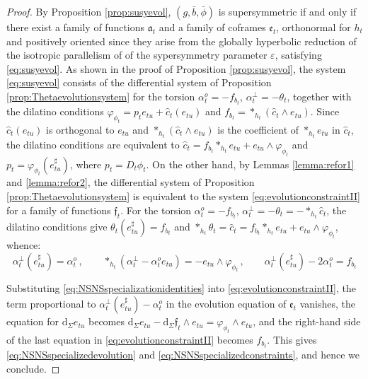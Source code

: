 \documentclass[10pt,reqno,a4paper]{amsart}
\theoremstyle{plain}
\theoremstyle{definition}
\theoremstyle{remark}
\theoremstyle{remark}
\def\dd{\mathrm{d}}
\def\fra{\mathfrak{a}}
\def\fre{\mathfrak{e}}
\renewcommand{\(}{ (}
\renewcommand{\)}{ )}
\newcommand{\frf}{\mathfrak{f}}
\begin{document}
\begin{proof}
By Proposition \ref{prop:susyevol}, $(g,\bar b,\bar\phi)$ is supersymmetric if and only if there exist a family of functions $\fra_t$ and a family of coframes $\fre_t$, orthonormal for $h_t$ and positively oriented since they arise from the globally hyperbolic reduction of the isotropic parallelism of of the sypersymmetry parameter $\varepsilon$, satisfying \eqref{eq:susyevol}. As shown in the proof of Proposition \ref{prop:susyevol}, the system \eqref{eq:susyevol} consists of the differential system of Proposition \ref{prop:Thetaevolutionsystem} for the torsion $\alpha^o_t = - f_{b_t}$, $\alpha^{\perp}_t = -\theta_t$, together with the dilatino conditions $\varphi_{\phi_t}=p_t e_{tu}+\widehat{c}_t(e_{tu})$ and $f_{b_t}=\ast_{h_t}(\widehat{c}_t\wedge e_{tu})$. Since $\widehat{c}_t(e_{tu})$ is orthogonal to $e_{tu}$ and $\ast_{h_t}(\widehat{c}_t\wedge e_{tu})$ is the coefficient of $\ast_{h_t}e_{tu}$ in $\widehat{c}_t$, the dilatino conditions are equivalent to $\widehat{c}_t = f_{b_t}\ast_{h_t} e_{tu} + e_{tu}\wedge \varphi_{\phi_t}$ and $p_t = \varphi_{\phi_t}(e^{\sharp}_{tu})$, where $p_t = D_t \phi_t$. On the other hand, by Lemmas \ref{lemma:refor1} and \ref{lemma:refor2}, the differential system of Proposition \ref{prop:Thetaevolutionsystem} is equivalent to the system \eqref{eq:evolutionconstraintII} for a family of functions $\frf_t$. For the torsion $\alpha^o_t = - f_{b_t}$, $\alpha^{\perp}_t = -\theta_t = -\ast_{h_t}\widehat{c}_t$, the dilatino conditions give $\theta_t(e^{\sharp}_{tu}) = f_{b_t}$ and $\ast_{h_t}\theta_t = \widehat{c}_t = f_{b_t}\ast_{h_t} e_{tu} + e_{tu}\wedge \varphi_{\phi_t}$, whence:
\begin{equation}
\label{eq:NSNSspecializationidentities}
 \alpha_t^\perp(e^{\sharp}_{tu}) = \alpha_t^o\, , \qquad \ast_{h_t}(\alpha_t^\perp-\alpha_t^oe_{tu}) = - e_{tu}\wedge\varphi_{\phi_t}\, ,
 \qquad
 \alpha_t^\perp(e^{\sharp}_{tu})-2\alpha_t^o=f_{b_t}
\end{equation}

\noindent
Substituting \eqref{eq:NSNSspecializationidentities} into \eqref{eq:evolutionconstraintII}, the term proportional to $\alpha^{\perp}_t(e^{\sharp}_{tu}) - \alpha^o_t$ in the evolution equation of $\fre_t$ vanishes, the equation for $\dd_{\Sigma} e_{tu}$ becomes $\dd_{\Sigma} e_{tu} - \dd_{\Sigma}\frf_t\wedge e_{tu} = \varphi_{\phi_t}\wedge e_{tu}$, and the right-hand side of the last equation in \eqref{eq:evolutionconstraintII} becomes $f_{b_t}$. This gives \eqref{eq:NSNSspecializedevolution} and \eqref{eq:NSNSspecializedconstraints}, and hence we conclude.
\end{proof}
\end{document}
